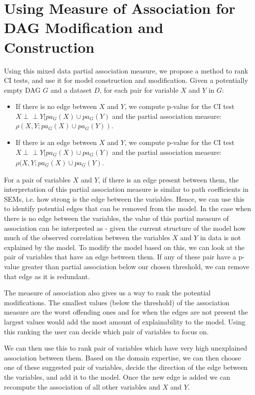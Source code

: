 \documentclass[letterpaper]{article} %
\def\ci{\perp\!\!\!\!\!\perp}
\begin{document}
\section{Using Measure of Association for DAG Modification and Construction}
\label{sec:modification}

Using this mixed data partial association measure, we propose a method to rank
CI tests, and use it for model construction and modification. Given a
potentially empty DAG $ G $ and a dataset $ D $, for each pair for variable $ X
$ and $ Y $ in $ G $:
\begin{itemize}
	\item If there is no edge between $ X $ and $ Y $, we compute p-value for the CI test $ X \ci Y \rvert pa_G(X) \cup pa_G(Y) $ and the partial association measure: $ \rho(X, Y; pa_G(X) \cup pa_G(Y)) $.
	\item If there is an edge between $ X $ and $ Y $, we compute p-value for the CI test $ X \ci Y \rvert pa_{\underline{G}}(X) \cup pa_{\underline{G}}(Y) $ and the partial association measure: $ \rho(X, Y; pa_{\underline{G}}(X) \cup pa_{\underline{G}}(Y) $.
\end{itemize}

For a pair of variables $ X $ and $ Y $, if there is an edge present between
them, the interpretation of this partial association measure is similar to path
coefficients in SEMs, i.e. how strong is the edge between the variables. Hence,
we can use this to identify potential edges that can be removed from the model.
In the case when there is no edge between the variables, the value of this
partial measure of association can be interpreted as - given the current
structure of the model how much of the observed correlation between the
variables $ X $ and $ Y $ in data is not explained by the model. To modify the
model based on this, we can look at the pair of variables that have an edge
between them. If any of these pair have a p-value greater than partial
association below our chosen threshold, we can remove that edge as it is
redundant.

The measure of association also gives us a way to rank the potential
modifications. The smallest values (below the threshold) of the association
measure are the worst offending ones and for when the edges are not present the
largest values would add the most amount of explainability to the model. Using
this ranking the user can decide which pair of variables to focus on.

We can then use this to rank pair of variables which have very high unexplained
association between them. Based on the domain expertise, we can then choose one
of these suggested pair of variables, decide the direction of the edge between
the variables, and add it to the model. Once the new edge is added we can
recompute the association of all other variables and $ X $ and $ Y $.
\end{document}
